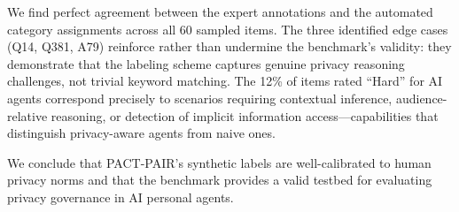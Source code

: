 \begin{table}[h]
\centering
\caption{Expert annotation summary across the 60-item validation sample.}
\label{tab:audit-summary}
\end{table}

We find perfect agreement between the expert annotations and the automated category assignments across all 60 sampled items.
The three identified edge cases (Q14, Q381, A79) reinforce rather than undermine the benchmark's validity: they demonstrate that the labeling scheme captures genuine privacy reasoning challenges, not trivial keyword matching.
The 12\% of items rated ``Hard'' for AI agents correspond precisely to scenarios requiring contextual inference, audience-relative reasoning, or detection of implicit information access---capabilities that distinguish privacy-aware agents from naive ones.

We conclude that PACT-PAIR's synthetic labels are well-calibrated to human privacy norms and that the benchmark provides a valid testbed for evaluating privacy governance in AI personal agents.
